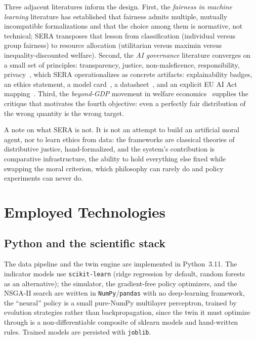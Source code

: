 \documentclass[11pt,a4paper]{article}
\newcommand{\code}[1]{\texttt{#1}}
\begin{document}
Three adjacent literatures inform the design. First, the \emph{fairness in
machine learning} literature has established that fairness admits multiple,
mutually incompatible formalizations and that the choice among them is
normative, not technical; SERA transposes that lesson from classification
(individual versus group fairness) to resource allocation (utilitarian versus
maximin versus inequality-discounted welfare). Second, the \emph{AI governance}
literature converges on a small set of principles: transparency, justice,
non-maleficence, responsibility, privacy~\cite{jobin2019}, which SERA
operationalizes as concrete artifacts: explainability badges, an ethics
statement, a model card~\cite{mitchell2019}, a datasheet~\cite{gebru2021}, and
an explicit EU AI Act mapping~\cite{aiact2024}. Third, the \emph{beyond-GDP}
movement in welfare economics~\cite{stiglitz2009} supplies the critique that
motivates the fourth objective: even a perfectly fair distribution of the wrong
quantity is the wrong target.

A note on what SERA is not. It is not an attempt to build an artificial moral
agent, nor to learn ethics from data: the frameworks are classical theories of
distributive justice, hand-formalized, and the system's contribution is
comparative infrastructure, the ability to hold everything else fixed while
swapping the moral criterion, which philosophy can rarely do and policy
experiments can never do.

\section{Employed Technologies}
\label{sec:tech}

\subsection{Python and the scientific stack}

The data pipeline and the twin engine are implemented in Python~3.11. The
indicator models use \code{scikit-learn} (ridge regression by default, random
forests as an alternative); the simulator, the gradient-free policy optimizers,
and the NSGA-II search are written in \code{NumPy}/\code{pandas} with no
deep-learning framework, the ``neural'' policy is a small pure-NumPy
multilayer perceptron, trained by evolution strategies rather than
backpropagation, since the twin it must optimize through is a
non-differentiable composite of sklearn models and hand-written rules. Trained
models are persisted with \code{joblib}.
\end{document}
